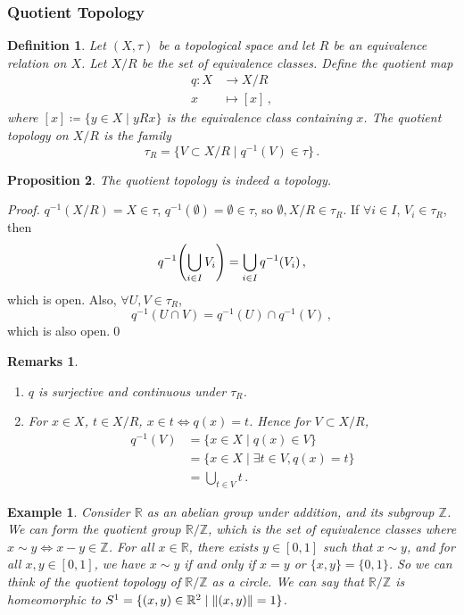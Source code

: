 \documentclass{article}
\theoremstyle{plain}\theoremheaderfont{\normalfont\itshape}\theorembodyfont{\rmfamily}\theoremseparator{.}\newtheorem*{rem}{Remark}\newtheorem*{ex}{Example}\newtheorem*{proof}{Proof}\newtheorem*{altp}{Alternative proof}
\theoremstyle{plain}\theoremheaderfont{\normalfont\bfseries}\theorembodyfont{\rmfamily}\theoremseparator{.}\newtheorem{thm}{Theorem}[section]\newtheorem{lem}[thm]{Lemma}\newtheorem{prop}[thm]{Proposition}\newtheorem*{cor}{Corollary}\newtheorem{defn}[thm]{Definition}\newtheorem{clm}[thm]{Claim}\newtheorem{clminproof}{Claim}
\theoremstyle{break}\theoremheaderfont{\normalfont\itshape}\theorembodyfont{\rmfamily}\theoremseparator{.\medskip}\newtheorem*{proofskip}{Proof}\newtheorem*{exs}{Examples}\newtheorem*{rems}{Remarks}
\theoremstyle{break}\theoremheaderfont{\normalfont\bfseries}\theorembodyfont{\rmfamily}\theoremseparator{.\medskip}\newtheorem{lemskip}[thm]{Lemma}\newtheorem{defnskip}[thm]{Definition}\newtheorem{propskip}[thm]{Proposition}\newtheorem{thmskip}[thm]{Theorem}
\newcommand{\qed}{\hfill\ensuremath{\Box}}
\begin{document}
    \subsubsection{Quotient Topology}
    \begin{defn}
        Let \((X,\tau)\) be a topological space and let \(R\) be an equivalence relation on \(X\). Let \(X/R\) be the set of \textit{equivalence classes}. Define the \textit{quotient map}
        \begin{align*}
            q:X&\to X/R\\
            x&\mapsto[x]\,,
        \end{align*}
        where \([x]\coloneqq\{y\in X\mid yRx\}\) is the equivalence class containing \(x\). The \textit{quotient topology} on \(X/R\) is the family
        \[\tau_R=\{V\subset X/R\mid q^{-1}(V)\in\tau\}\,.\]
    \end{defn}

    \begin{prop}
        The quotient topology is indeed a topology.
    \end{prop}
    \begin{proof}
        \(q^{-1}(X/R)=X\in\tau\), \(q^{-1}(\emptyset)=\emptyset\in\tau\), so \(\emptyset, X/R\in\tau_R\). If \(\forall i\in I\), \(V_i\in\tau_R\), then
        \[q^{-1}\qty(\bigcup_{i\in I}V_i)=\bigcup_{i\in I}q^{-1}(V_i)\,,\]
        which is open. Also, \(\forall U,V\in\tau_R\),
        \[q^{-1}(U\cap V)=q^{-1}(U)\cap q^{-1}(V)\,,\]
        which is also open.\qed
    \end{proof}
    \begin{rems}
        \begin{enumerate}[label=(\roman*),topsep=0pt]
            \item \(q\) is surjective and continuous under \(\tau_R\).
            \item For \(x\in X\), \(t\in X/R\), \(x\in t\iff q(x)=t\). Hence for \(V\subset X/R\),
            \begin{align*}
                q^{-1}(V)&=\{x\in X\mid q(x)\in V\}\\
                &=\{x\in X\mid\exists t\in V, q(x)=t\}\\
                &=\bigcup_{t\in V}t\,.
            \end{align*}
        \end{enumerate}
    \end{rems}
    \begin{ex}
        Consider \(\mathbb{R}\) as an abelian group under addition, and its subgroup \(\mathbb{Z}\). We can form the quotient group \(\mathbb{R}/\mathbb{Z}\), which is the set of equivalence classes where \(x\sim y\iff x-y\in\mathbb{Z}\). For all \(x\in\mathbb{R}\), there exists \(y\in[0,1]\) such that \(x\sim y\), and for all \(x,y\in[0,1]\), we have \(x\sim y\) if and only if \(x=y\) or \(\{x,y\}=\{0,1\}\). So we can think of the quotient topology of \(\mathbb{R}/\mathbb{Z}\) as a circle. We can say that \(\mathbb{R}/\mathbb{Z}\) is homeomorphic to \(S^1=\{(x,y)\in\mathbb{R}^2\mid\norm{(x,y)}=1\}\).
    \end{ex}
\end{document}
